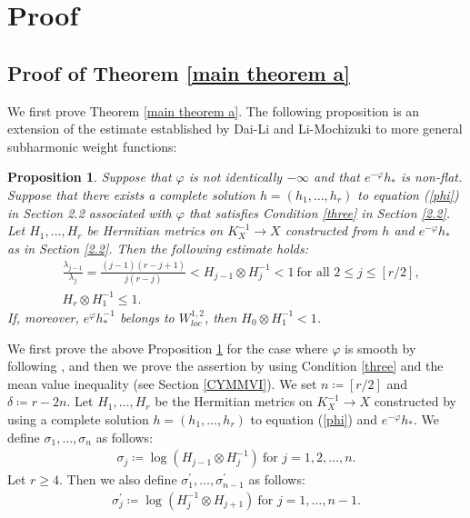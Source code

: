 \documentclass[12pt]{article}
\theoremstyle{definition}
\newtheorem{prop}[defi]{Proposition}
\def\refe{\ast}
\begin{document}
\section{Proof}\label{6}
\subsection{Proof of Theorem \ref{main theorem a}}
We first prove Theorem \ref{main theorem a}. The following proposition is an extension of the estimate established by Dai-Li \cite{DL1, DL2} and Li-Mochizuki \cite{LM1} to more general subharmonic weight functions:
\begin{prop}\label{r/2}
{\it Suppose that $\varphi$ is not identically $-\infty$ and that $e^{-\varphi}h_\refe$ is non-flat. Suppose that there exists a complete solution $h=(h_1,\dots, h_r)$ to equation (\ref{phi}) in Section {2.2} associated with $\varphi$ that satisfies Condition \ref{three} in Section \ref{2.2}. Let $H_1,\dots, H_r$ be Hermitian metrics on $K_X^{-1}\rightarrow X$ constructed from $h$ and $e^{-\varphi}h_\refe$ as in Section \ref{2.2}. Then the following estimate holds:
\begin{align}
&\frac{\lambda_{j-1}}{\lambda_j}=\frac{(j-1)(r-j+1)}{j(r-j)}<H_{j-1}\otimes H_j^{-1}<1 \ \text{for all $2\leq j\leq [r/2]$},\label{Gauss}\\
& H_r\otimes H_1^{-1}\leq 1. \label{Euler}
\end{align}
If, moreover, $e^{\varphi}h_\refe^{-1}$ belongs to $W^{1,2}_{loc}$, then $H_0\otimes H_1^{-1}<1$.
}
\end{prop}
We first prove the above Proposition \ref{r/2} for the case where $\varphi$ is smooth by following \cite[Theorem 4.4]{LM1}, and then we prove the assertion by using Condition \ref{three} and the mean value inequality (see Section \ref{CYMMVI}). We set $n\coloneqq [r/2]$ and $\delta\coloneqq r-2n$. Let $H_1,\dots, H_r$ be the Hermitian metrics on $K_X^{-1}\rightarrow X$ constructed by using a complete solution $h=(h_1,\dots, h_r)$ to equation (\ref{phi}) and $e^{-\varphi}h_\refe$. We define $\sigma_1,\dots, \sigma_n$ as follows:
\begin{align*}
\sigma_j\coloneqq \log(H_{j-1}\otimes H_j^{-1}) \ \text{for $j=1,2,\dots, n$.}
\end{align*}
Let $r\geq 4$. Then we also define $\sigma^\prime_1,\dots, \sigma_{n-1}^\prime$ as follows:
\begin{align*}
\sigma_j^\prime\coloneqq \log(H_j^{-1}\otimes H_{j+1}) \ \text{for $j=1,\dots, n-1$}.
\end{align*}
\end{document}
